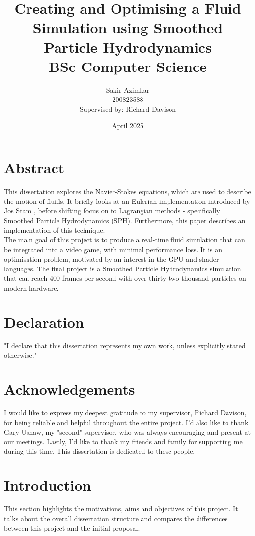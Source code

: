 \documentclass[12pt]{article}
\title
{
    {\Huge Creating and Optimising a Fluid Simulation using Smoothed Particle Hydrodynamics} \\
    \vspace*{1cm}
    {\LARGE BSc Computer Science}
}
\author
{
    \vspace*{0.1cm}\huge Sakir Azimkar \\
    \vspace*{1cm}\huge 200823588 \\
    \large Supervised by: Richard Davison
}
\date{April 2025}
\begin{document}
    \maketitle
    \newpage

    \section*{Abstract}
    This dissertation explores the Navier-Stokes equations, which are used to describe the motion of fluids. It briefly looks at an Eulerian implementation introduced by Jos Stam \cite{stam}, before shifting focus on to Lagrangian methods - specifically Smoothed Particle Hydrodynamics (SPH). Furthermore, this paper describes an implementation of this technique. \\ The main goal of this project is to produce a real-time fluid simulation that can be integrated into a video game, with minimal performance loss. It is an optimisation problem, motivated by an interest in the GPU and shader languages. The final project is a Smoothed Particle Hydrodynamics simulation that can reach 400 frames per second with over thirty-two thousand particles on modern hardware.
    
    \newpage

    \section*{Declaration} "I declare that this dissertation represents my own work, unless explicitly stated otherwise."

    \newpage

    \section*{Acknowledgements}
    I would like to express my deepest gratitude to my supervisor, Richard Davison, for being reliable and helpful throughout the entire project. I'd also like to thank Gary Ushaw, my "second" supervisor, who was always encouraging and present at our meetings. Lastly, I'd like to thank my friends and family for supporting me during this time. This dissertation is dedicated to these people.
    
    \newpage
    \tableofcontents
    \newpage
    \listoffigures
    \newpage

    \section{Introduction}
    This section highlights the motivations, aims and objectives of this project. It talks about the overall dissertation structure and compares the differences between this project and the initial proposal.
    
\end{document}
